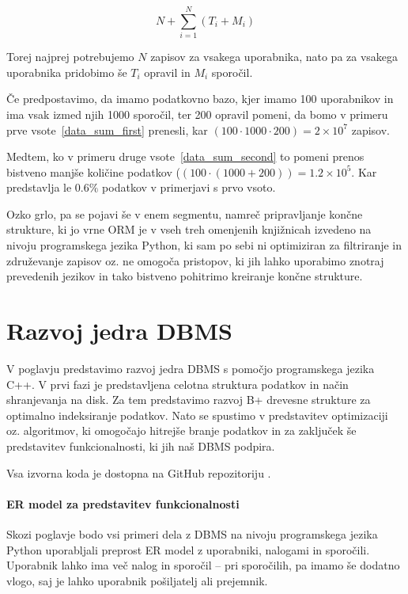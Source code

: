 \documentclass[a4paper,12pt,openright]{book}
\begin{document}
    \begin{equation}
        N + \sum_{i=1}^{N} (T_i + M_i)
    \label{data_sum_second}
    \end{equation}

    \noindent
    Torej najprej potrebujemo $N$ zapisov za vsakega uporabnika, nato pa za vsakega uporabnika pridobimo še $T_i$ opravil in $M_i$ sporočil.
    
    Če predpostavimo, da imamo podatkovno bazo, kjer imamo \num{100} uporabnikov in ima vsak izmed njih \num{1000} sporočil, ter \num{200} opravil pomeni, da bomo v primeru prve vsote~\eqref{data_sum_first} prenesli, kar $(100 \cdot 1000 \cdot 200) = 2 \times 10^7$ zapisov.

    Medtem, ko v primeru druge vsote~\eqref{data_sum_second} to pomeni prenos bistveno manjše količine podatkov ($(100 \cdot (1000 + 200)) = 1.2 \times 10^5$. Kar predstavlja le $0.6\%$ podatkov v primerjavi s prvo vsoto.

    Ozko grlo, pa se pojavi še v enem segmentu, namreč pripravljanje končne strukture, ki jo vrne ORM je v vseh treh omenjenih knjižnicah izvedeno na nivoju programskega jezika Python, ki sam po sebi ni optimiziran za filtriranje in združevanje zapisov oz. ne omogoča pristopov, ki jih lahko uporabimo znotraj prevedenih jezikov in tako bistveno pohitrimo kreiranje končne strukture.

\chapter{Razvoj jedra DBMS}
\label{ch0}
    V poglavju predstavimo razvoj jedra DBMS s pomočjo programskega jezika C++. V prvi fazi je predstavljena celotna struktura podatkov in način shranjevanja na disk. Za tem predstavimo razvoj B+ drevesne strukture za optimalno indeksiranje podatkov. Nato se spustimo v predstavitev optimizaciji oz. algoritmov, ki omogočajo hitrejše branje podatkov in za zaključek še predstavitev funkcionalnosti, ki jih naš DBMS podpira.

    Vsa izvorna koda je dostopna na GitHub repozitoriju \cite{GRAPHENIX_GITHUB}.

    \subsubsection{ER model za predstavitev funkcionalnosti}
    Skozi poglavje bodo vsi primeri dela z DBMS na nivoju programskega jezika Python uporabljali preprost ER model z uporabniki, nalogami in sporočili. Uporabnik lahko ima več nalog in sporočil – pri sporočilih, pa imamo še dodatno vlogo, saj je lahko uporabnik pošiljatelj ali prejemnik.
\end{document}
